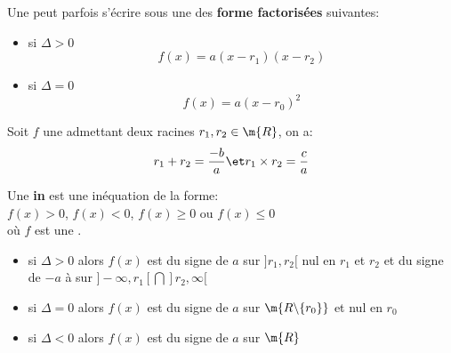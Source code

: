 Une  peut parfois s'écrire sous une des \textbf{forme factorisées} suivantes:
\begin{itemize}
    \item si $\Delta>0$
    \begin{equation*}
        f(x) = a(x-r_1)(x-r_2)
    \end{equation*}
    \item si $\Delta=0$
    \begin{equation*}
        f(x) = a(x-r_0)^2
    \end{equation*}
\end{itemize}

\rmq{}
Soit $f$ une  admettant deux racines $r_1,r_2\in\m{R}$, on a:
\begin{equation*}
    r_1+r_2 = \dfrac{-b}{a} \et r_1\times r_2 = \dfrac{c}{a}
\end{equation*}

\newpage
\hbox{}

Une \textbf{in} est une inéquation de la forme:\\
$f(x) > 0$, $f(x) < 0$, $f(x) \geqslant 0$ ou $f(x) \leqslant 0$\\
où $f$ est une .

\begin{itemize}
    \item si $\Delta>0$ alors $f(x)$ est du signe de $a$ sur $]r_1,r_2[$ nul en $r_1$ et $r_2$
    et du signe de $-a$ à sur $]-\infty,r_1[\bigcap]r_2,\infty[$
    \item si $\Delta=0$ alors $f(x)$ est du signe de $a$ sur $\m{R\backslash\{r_0\}}$ et nul en $r_0$
    \item si $\Delta<0$ alors $f(x)$ est du signe de $a$ sur $\m{R}$
\end{itemize}
